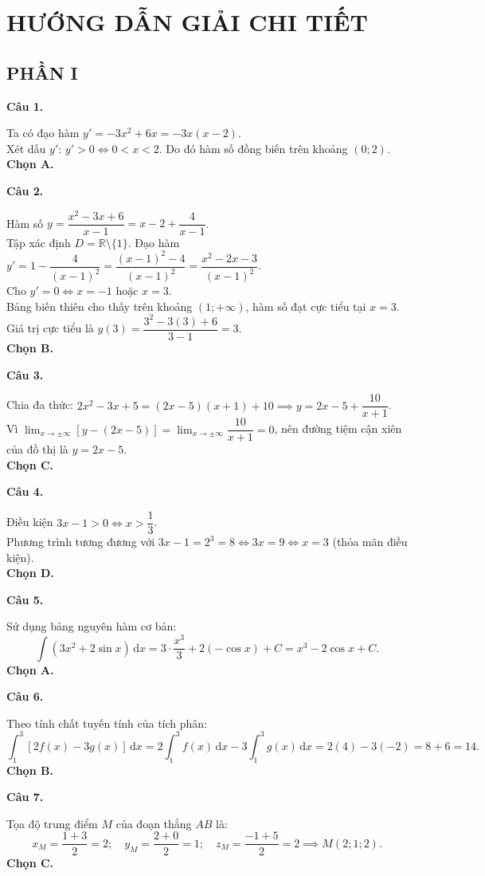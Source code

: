 \documentclass[12pt,a4paper]{article}
\newcommand{\loigiai}[1]{\par\medskip\Needspace{4\baselineskip}\noindent\textbf{#1}\par\nobreak}
\begin{document}
\newpage
\section*{\large HƯỚNG DẪN GIẢI CHI TIẾT}

\subsection*{PHẦN I}

\loigiai{Câu 1.}
Ta có đạo hàm $y' = -3x^2 + 6x = -3x(x - 2)$.\\
Xét dấu $y'$: $y' > 0 \iff 0 < x < 2$. Do đó hàm số đồng biến trên khoảng $(0; 2)$.\\
\textbf{Chọn A.}

\loigiai{Câu 2.}
Hàm số $y = \dfrac{x^2 - 3x + 6}{x - 1} = x - 2 + \dfrac{4}{x - 1}$.\\
Tập xác định $D = \mathbb{R} \setminus \{1\}$. Đạo hàm $y' = 1 - \dfrac{4}{(x - 1)^2} = \dfrac{(x - 1)^2 - 4}{(x - 1)^2} = \dfrac{x^2 - 2x - 3}{(x - 1)^2}$.\\
Cho $y' = 0 \iff x = -1$ hoặc $x = 3$.\\
Bảng biến thiên cho thấy trên khoảng $(1; +\infty)$, hàm số đạt cực tiểu tại $x = 3$. Giá trị cực tiểu là $y(3) = \dfrac{3^2 - 3(3) + 6}{3 - 1} = 3$.\\
\textbf{Chọn B.}

\loigiai{Câu 3.}
Chia đa thức: $2x^2 - 3x + 5 = (2x - 5)(x + 1) + 10 \implies y = 2x - 5 + \dfrac{10}{x + 1}$.\\
Vì $\lim_{x \to \pm\infty} [y - (2x - 5)] = \lim_{x \to \pm\infty} \dfrac{10}{x + 1} = 0$, nên đường tiệm cận xiên của đồ thị là $y = 2x - 5$.\\
\textbf{Chọn C.}

\loigiai{Câu 4.}
Điều kiện $3x - 1 > 0 \iff x > \dfrac{1}{3}$.\\
Phương trình tương đương với $3x - 1 = 2^3 = 8 \iff 3x = 9 \iff x = 3$ (thỏa mãn điều kiện).\\
\textbf{Chọn D.}

\loigiai{Câu 5.}
Sử dụng bảng nguyên hàm cơ bản:
$$\int (3x^2 + 2\sin x)\,\mathrm{d}x = 3 \cdot \dfrac{x^3}{3} + 2(-\cos x) + C = x^3 - 2\cos x + C.$$
\textbf{Chọn A.}

\loigiai{Câu 6.}
Theo tính chất tuyến tính của tích phân:
$$\int_1^3 [2f(x) - 3g(x)]\,\mathrm{d}x = 2\int_1^3 f(x)\,\mathrm{d}x - 3\int_1^3 g(x)\,\mathrm{d}x = 2(4) - 3(-2) = 8 + 6 = 14.$$
\textbf{Chọn B.}

\loigiai{Câu 7.}
Tọa độ trung điểm $M$ của đoạn thẳng $AB$ là:
$$x_M = \dfrac{1 + 3}{2} = 2;\quad y_M = \dfrac{2 + 0}{2} = 1;\quad z_M = \dfrac{-1 + 5}{2} = 2 \implies M(2; 1; 2).$$
\textbf{Chọn C.}
\end{document}
